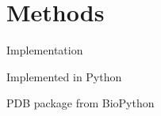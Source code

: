 \section{Methods}

\begin{frame}{Implementation}
    \item Implemented in Python
    \item PDB package from BioPython
\end{frame}
